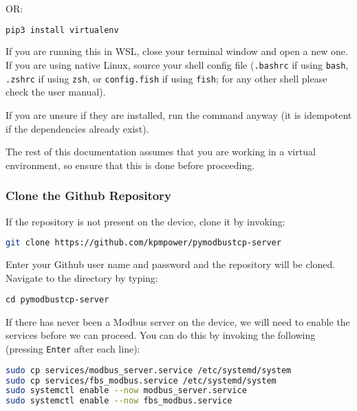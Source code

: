 \documentclass[10pt,]{article}
\newcommand{\passthrough}[1]{#1}
\begin{document}
OR:

\begin{lstlisting}[language=bash]
pip3 install virtualenv
\end{lstlisting}

If you are running this in WSL, close your terminal window and open a
new one. If you are using native Linux, source your shell config file
(\passthrough{\lstinline!.bashrc!} if using
\passthrough{\lstinline!bash!}, \passthrough{\lstinline!.zshrc!} if
using \passthrough{\lstinline!zsh!}, or
\passthrough{\lstinline!config.fish!} if using
\passthrough{\lstinline!fish!}; for any other shell please check the
user manual).

If you are unsure if they are installed, run the command anyway (it is
idempotent if the dependencies already exist).

The rest of this documentation assumes that you are working in a virtual
environment, so ensure that this is done before proceeding.

\hypertarget{clone-the-github-repository}{%
\subsubsection{Clone the Github
Repository}\label{clone-the-github-repository}}

If the repository is not present on the device, clone it by invoking:

\begin{lstlisting}[language=bash]
git clone https://github.com/kpmpower/pymodbustcp-server
\end{lstlisting}

Enter your Github user name and password and the repository will be
cloned. Navigate to the directory by typing:

\begin{lstlisting}
cd pymodbustcp-server
\end{lstlisting}

If there has never been a Modbus server on the device, we will need to
enable the services before we can proceed. You can do this by invoking
the following (pressing \passthrough{\lstinline!Enter!} after each
line):

\begin{lstlisting}[language=bash]
sudo cp services/modbus_server.service /etc/systemd/system
sudo cp services/fbs_modbus.service /etc/systemd/system
sudo systemctl enable --now modbus_server.service
sudo systemctl enable --now fbs_modbus.service
\end{lstlisting}
\end{document}
